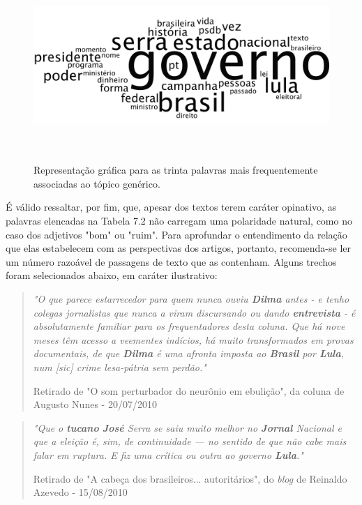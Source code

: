 \begin{figure}[h]
  \centering %
  \includegraphics[width=12.5cm, height=6.5cm]{generico.png}\\
  \caption{Representação gráfica para as trinta palavras mais frequentemente associadas ao tópico genérico.}
  \label{generico}
\end{figure}


É válido ressaltar, por fim, que, apesar dos textos terem caráter opinativo, as palavras elencadas na Tabela 7.2 não carregam uma polaridade natural, como no caso dos adjetivos "bom" ou "ruim". Para aprofundar o entendimento da relação que elas estabelecem com as perspectivas dos artigos, portanto, recomenda-se ler um número razoável de passagens de texto que as contenham. Alguns trechos foram selecionados abaixo, em caráter ilustrativo:

\begin{quote}
\emph{"O que parece estarrecedor para quem nunca ouviu \textbf{Dilma} antes - e tenho colegas jornalistas que nunca a viram discursando ou dando \textbf{entrevista} - é absolutamente familiar para os frequentadores desta coluna. Que há nove meses têm acesso a veementes indícios, há muito transformados em provas documentais, de que \textbf{Dilma} é uma afronta imposta ao \textbf{Brasil} por \textbf{Lula}, num [sic] crime lesa-pátria sem perdão."}

{\small Retirado de "O som perturbador do neurônio em ebulição", da coluna de Augusto Nunes - 20/07/2010}
\end{quote}

\begin{quote}
\emph{"Que o \textbf{tucano} \textbf{José} Serra se saiu muito melhor no \textbf{Jornal} Nacional e que a eleição é, sim, de continuidade — no sentido de que não cabe mais falar em ruptura. E fiz uma crítica ou outra ao governo \textbf{Lula}."}

{\small Retirado de "A cabeça dos brasileiros... autoritários", do \emph{blog} de Reinaldo Azevedo - 15/08/2010}
\end{quote}

